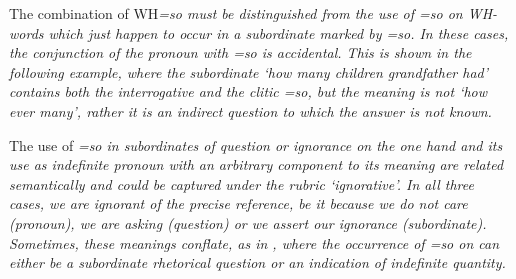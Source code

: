 

The combination of WH\em=so \em must be distinguished from the use of \em =so \em on WH-words which just happen to occur in a subordinate marked by \em =so\em. In these cases,  the conjunction of the pronoun with \em =so \em is accidental. This is shown in the following example, where the subordinate `how many children grandfather had' contains both the interrogative  and the clitic \em =so\em, but the meaning is not `how ever many', rather it is an indirect question to which the answer is not known.


The use of \em =so \em in subordinates of question or ignorance on the one hand and its use as indefinite pronoun with an arbitrary component to its meaning are related semantically and could be captured under the rubric `ignorative'. In all three cases, we are ignorant of the precise reference, be it because we do not care (pronoun), we are asking (question) or we assert our ignorance (subordinate). Sometimes, these meanings conflate, as in , where the  occurrence of \em =so \em on  can either be a subordinate rhetorical question or an indication of indefinite quantity.






